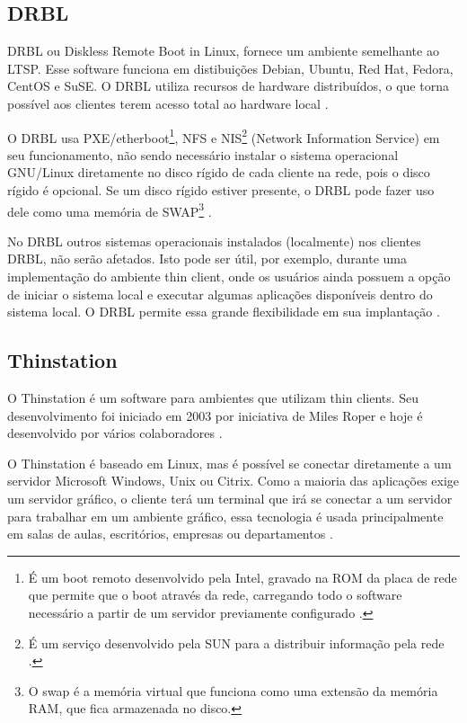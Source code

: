 \documentclass[
	12pt,				%
	openright,			%
	twoside,			%
	a4paper,			%
	chapter=TITLE,		%
	english,			%
	brazil				%
	]{abntex2}
\begin{document}
\subsection{DRBL}

DRBL ou Diskless Remote Boot in Linux, fornece um ambiente semelhante ao LTSP. Esse software funciona em distibuições Debian, Ubuntu, Red Hat, Fedora, CentOS e SuSE. O DRBL utiliza recursos de hardware distribuídos, o que torna possível aos clientes terem acesso total ao hardware local \cite{drbl}.

O DRBL usa PXE/etherboot\footnote{É um boot remoto desenvolvido pela Intel, gravado na ROM da placa de rede que permite que o boot através da rede, carregando todo o software necessário a partir de um servidor previamente configurado \cite{pxe}.}, NFS e NIS\footnote{É um serviço desenvolvido pela SUN para a distribuir informação pela rede \cite{nis}.} (Network Information Service) em seu funcionamento, não sendo necessário instalar o sistema operacional GNU/Linux diretamente no disco rígido de cada cliente na rede, pois o disco rígido é opcional. Se um disco rígido estiver presente, o DRBL pode fazer uso dele como uma memória de SWAP\footnote{O swap é a memória virtual que funciona como uma extensão da memória RAM, que fica armazenada no disco.} \cite{drbl,piaui,Frank.drbl}.

No DRBL outros sistemas operacionais instalados (localmente) nos clientes DRBL, não serão afetados. Isto pode ser útil, por exemplo, durante uma implementação do ambiente thin client, onde os usuários ainda possuem a opção de iniciar o sistema local e executar algumas aplicações disponíveis dentro do sistema local. O DRBL permite essa grande flexibilidade em sua implantação \cite{drbl}.

\subsection{Thinstation}

O Thinstation é um software para ambientes que utilizam thin clients. Seu desenvolvimento foi iniciado em 2003 por iniciativa de Miles Roper e hoje é desenvolvido por vários colaboradores \cite{Thinstationl,piaui}.

O Thinstation é baseado em Linux, mas é possível se conectar diretamente a um servidor Microsoft Windows, Unix ou Citrix. Como a maioria das aplicações exige um servidor gráfico, o cliente terá um terminal que irá se conectar a um servidor para trabalhar em um ambiente gráfico, essa tecnologia é usada principalmente em salas de aulas, escritórios, empresas ou departamentos \cite{Thinstationl}.
\end{document}
